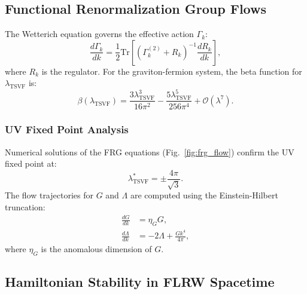 \documentclass[twocolumn,superscriptaddress,floatfix]{revtex4-2}
\begin{document}
\subsection{Functional Renormalization Group Flows}
\label{app:frg}

The Wetterich equation governs the effective action \(\Gamma_k\):
\begin{equation}
\frac{d\Gamma_k}{dk} = \frac{1}{2}\text{Tr}\left[\left(\Gamma_k^{(2)} + R_k\right)^{-1}\frac{dR_k}{dk}\right],
\end{equation}
where \(R_k\) is the regulator. For the graviton-fermion system, the beta function for \(\lambda_{\text{TSVF}}\) is:
\begin{equation}
\beta(\lambda_{\text{TSVF}}) = \frac{3\lambda_{\text{TSVF}}^3}{16\pi^2} - \frac{5\lambda_{\text{TSVF}}^5}{256\pi^4} + \mathcal{O}(\lambda^7).
\end{equation}

\subsubsection{UV Fixed Point Analysis}
Numerical solutions of the FRG equations (Fig.~\ref{fig:frg_flow}) confirm the UV fixed point at:
\begin{equation}
\lambda_{\text{TSVF}}^* = \pm \frac{4\pi}{\sqrt{3}}.
\end{equation}
The flow trajectories for \(G\) and \(\Lambda\) are computed using the Einstein-Hilbert truncation:
\begin{align}
\frac{dG}{dk} &= \eta_G G, \\
\frac{d\Lambda}{dk} &= -2\Lambda + \frac{G k^4}{4\pi},
\end{align}
where \(\eta_G\) is the anomalous dimension of \(G\).

\subsection{Hamiltonian Stability in FLRW Spacetime}
\label{app:hamiltonian}
\end{document}
